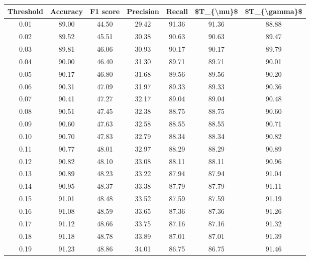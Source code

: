 \begin{tabular}{|c|c|c|c|c|c|c|}
\hline
 Threshold &  Accuracy &  F1 score &  Precision &  Recall &  \$T\_\{\textbackslash mu\}\$ &  \$T\_\{\textbackslash gamma\}\$ \\
\hline
      0.01 &     89.00 &     44.50 &      29.42 &   91.36 &      91.36 &         88.88 \\
      0.02 &     89.52 &     45.51 &      30.38 &   90.63 &      90.63 &         89.47 \\
      0.03 &     89.81 &     46.06 &      30.93 &   90.17 &      90.17 &         89.79 \\
      0.04 &     90.00 &     46.40 &      31.30 &   89.71 &      89.71 &         90.01 \\
      0.05 &     90.17 &     46.80 &      31.68 &   89.56 &      89.56 &         90.20 \\
      0.06 &     90.31 &     47.09 &      31.97 &   89.33 &      89.33 &         90.36 \\
      0.07 &     90.41 &     47.27 &      32.17 &   89.04 &      89.04 &         90.48 \\
      0.08 &     90.51 &     47.45 &      32.38 &   88.75 &      88.75 &         90.60 \\
      0.09 &     90.60 &     47.63 &      32.58 &   88.55 &      88.55 &         90.71 \\
      0.10 &     90.70 &     47.83 &      32.79 &   88.34 &      88.34 &         90.82 \\
      0.11 &     90.77 &     48.01 &      32.97 &   88.29 &      88.29 &         90.89 \\
      0.12 &     90.82 &     48.10 &      33.08 &   88.11 &      88.11 &         90.96 \\
      0.13 &     90.89 &     48.23 &      33.22 &   87.94 &      87.94 &         91.04 \\
      0.14 &     90.95 &     48.37 &      33.38 &   87.79 &      87.79 &         91.11 \\
      0.15 &     91.01 &     48.48 &      33.52 &   87.59 &      87.59 &         91.19 \\
      0.16 &     91.08 &     48.59 &      33.65 &   87.36 &      87.36 &         91.26 \\
      0.17 &     91.12 &     48.66 &      33.75 &   87.16 &      87.16 &         91.32 \\
      0.18 &     91.18 &     48.78 &      33.89 &   87.01 &      87.01 &         91.39 \\
      0.19 &     91.23 &     48.86 &      34.01 &   86.75 &      86.75 &         91.46 \\

\end{tabular}
